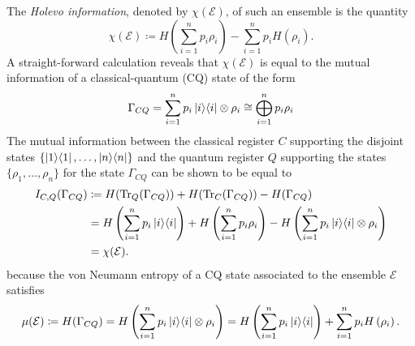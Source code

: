 \documentclass[notitlepage, 10pt]{article}
\begin{document}
The \textit{Holevo information}, denoted by $\chi(\mathcal E)$, of such an ensemble is the quantity
\begin{equation}
    \chi(\mathcal E) \coloneqq H(\sum_{i=1}^{n} p_i \rho_i) - \sum_{i=1}^{n} p_i H(\rho_i).
\end{equation}
A straight-forward calculation reveals that $\chi(\mathcal E)$ is equal to the mutual information of a classical-quantum (CQ) state of the form
\begin{equation}
    \Gamma_{CQ} = \sum_{i=1}^{n} p_i \ket i \! \bra i \otimes \rho_i \cong \bigoplus_{i=1}^{n} p_i \rho_i
\end{equation}
The mutual information between the classical register $C$ supporting the disjoint states $\{\ket 1 \! \bra 1, \ldots, \ket n \! \bra n\}$ and the quantum register $Q$ supporting the states $\{\rho_1, \ldots, \rho_n\}$ for the state $\Gamma_{CQ}$ can be shown to be equal to 
\begin{align}
    I_{C,Q}(\Gamma_{CQ}) 
    &\coloneqq H(\operatorname{Tr}_{Q}(\Gamma_{CQ})) + H(\operatorname{Tr}_{C}(\Gamma_{CQ})) - H(\Gamma_{CQ}) \\
    &= H\left(\sum_{i=1}^{n} p_i \ket i \! \bra i\right) + H\left(\sum_{i=1}^{n} p_i\rho_i\right) - H\left(\sum_{i=1}^{n} p_i \ket i \! \bra i \otimes \rho_i\right) \\
    &= \chi(\mathcal E).
\end{align}
because the von Neumann entropy of a CQ state associated to the ensemble $\mathcal E$ satisfies
\begin{equation}
    \mu(\mathcal E) \coloneqq H(\Gamma_{CQ}) = H\left(\sum_{i=1}^{n} p_i \ket i \! \bra i \otimes \rho_i\right) = H\left(\sum_{i=1}^{n} p_i \ket i \! \bra i\right) + \sum_{i=1}^{n} p_iH\left(\rho_i\right).
\end{equation}
\end{document}

